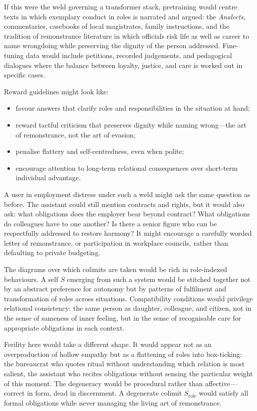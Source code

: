 If this were the weld governing a transformer stack, pretraining would centre texts in which exemplary conduct in roles is narrated and argued: the \emph{Analects}, commentaries, casebooks of local magistrates, family instructions, and the tradition of remonstrance literature in which officials risk life as well as career to name wrongdoing while preserving the dignity of the person addressed. Fine-tuning data would include petitions, recorded judgements, and pedagogical dialogues where the balance between loyalty, justice, and care is worked out in specific cases.

Reward guidelines might look like:

\begin{itemize}
  \item favour answers that clarify roles and responsibilities in the situation at hand;
  \item reward tactful criticism that preserves dignity while naming wrong---the art of remonstrance, not the art of evasion;
  \item penalise flattery and self-centredness, even when polite;
  \item encourage attention to long-term relational consequences over short-term individual advantage.
\end{itemize}

A user in employment distress under such a weld might ask the same question as before. The assistant could still mention contracts and rights, but it would also ask: what obligations does the employer bear beyond contract? What obligations do colleagues have to one another? Is there a senior figure who can be respectfully addressed to restore harmony? It might encourage a carefully worded letter of remonstrance, or participation in workplace councils, rather than defaulting to private budgeting.

The diagrams over which colimits are taken would be rich in role-indexed behaviours. A self $S$ emerging from such a system would be stitched together not by an abstract preference for autonomy but by patterns of fulfilment and transformation of roles across situations. Compatibility conditions would privilege relational consistency: the same person as daughter, colleague, and citizen, not in the sense of sameness of inner feeling, but in the sense of recognisable care for appropriate obligations in each context.

Ferility here would take a different shape. It would appear not as an overproduction of hollow empathy but as a flattening of roles into box-ticking: the bureaucrat who quotes ritual without understanding which relation is most salient, the assistant who recites obligations without sensing the particular weight of this moment. The degeneracy would be procedural rather than affective---correct in form, dead in discernment. A degenerate colimit $S_{\text{role}}$ would satisfy all formal obligations while never managing the living art of remonstrance.

